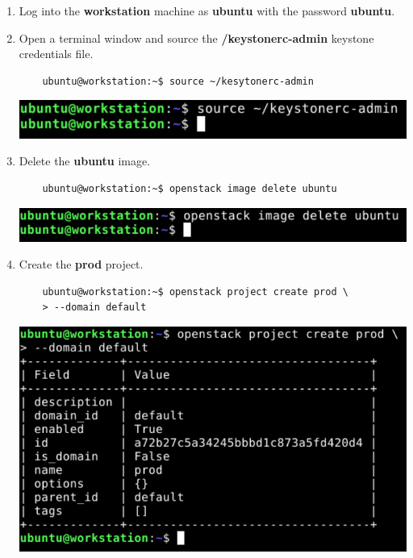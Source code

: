 \documentclass[letterpaper, 12pt]{article}
\begin{document}
\begin{enumerate}
    \item Log into the \textbf{workstation} machine as \textbf{ubuntu} with the password \textbf{ubuntu}.

    \item Open a terminal window and source the \textbf{\texttildemid/keystonerc-admin} keystone credentials file.
    \begin{lstlisting}
    ubuntu@workstation:~$ source ~/kesytonerc-admin
    \end{lstlisting}

    \begin{center}
        \includegraphics[width=\linewidth]{images/part1/step2.png}
    \end{center}

    \item Delete the \textbf{ubuntu} image.
    \begin{lstlisting}
    ubuntu@workstation:~$ openstack image delete ubuntu
    \end{lstlisting}

    \begin{center}
        \includegraphics[width=\linewidth]{images/part1/step3.png}
    \end{center}

    \item Create the \textbf{prod} project.
    \begin{lstlisting}
    ubuntu@workstation:~$ openstack project create prod \
    > --domain default
    \end{lstlisting}

    \begin{center}
        \includegraphics[width=\linewidth]{images/part1/step4.png}
    \end{center}


\end{enumerate}
\end{document}
